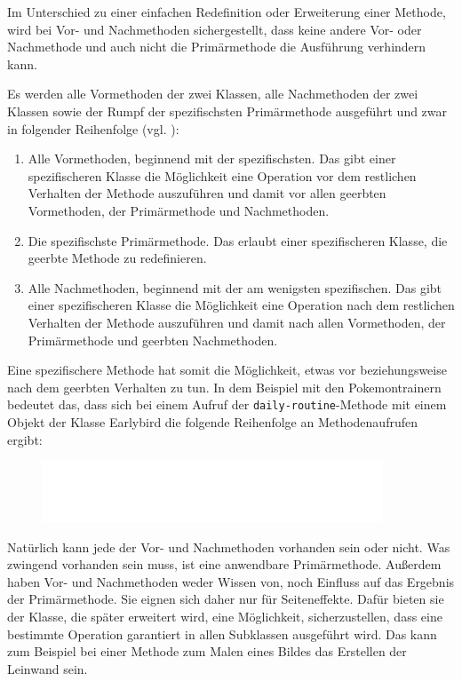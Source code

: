Im Unterschied zu einer einfachen Redefinition oder Erweiterung einer Methode, wird bei Vor- und Nachmethoden sichergestellt, dass keine andere Vor- oder Nachmethode und auch nicht die Primärmethode die Ausführung verhindern kann.

Es werden alle Vormethoden der zwei Klassen, alle Nachmethoden der zwei Klassen sowie der Rumpf der spezifischsten Primärmethode ausgeführt und zwar in folgender Reihenfolge (vgl. \cite[S. 50]{keene}):
\begin{enumerate}
 \item Alle Vormethoden, beginnend mit der spezifischsten. Das gibt einer spezifischeren Klasse die Möglichkeit eine Operation vor dem restlichen Verhalten der Methode auszuführen und damit vor allen geerbten Vormethoden, der Primärmethode und Nachmethoden.
 \item Die spezifischste Primärmethode. Das erlaubt einer spezifischeren Klasse, die geerbte Methode zu redefinieren.
 \item Alle Nachmethoden, beginnend mit der am wenigsten spezifischen. Das gibt einer spezifischeren Klasse die Möglichkeit eine Operation nach dem restlichen Verhalten der Methode auszuführen und damit nach allen Vormethoden, der Primärmethode und geerbten Nachmethoden.
\end{enumerate}

Eine spezifischere Methode hat somit die Möglichkeit, etwas vor beziehungsweise nach dem geerbten Verhalten zu tun. In dem Beispiel mit den Pokemontrainern bedeutet das, dass sich bei einem Aufruf der \texttt{daily-routine}-Methode mit einem Objekt der Klasse Earlybird die folgende Reihenfolge an Methodenaufrufen ergibt:

\begin{figure}[h]
 \centering
 \includegraphics[width=0.9\textwidth]{pictures/primary}
\end{figure}

Natürlich kann jede der Vor- und Nachmethoden vorhanden sein oder nicht. Was zwingend vorhanden sein muss, ist eine anwendbare Primärmethode. Außerdem haben Vor- und Nachmethoden weder Wissen von, noch Einfluss auf das Ergebnis der Primärmethode. Sie eignen sich daher nur für Seiteneffekte. Dafür bieten sie der Klasse, die später erweitert wird, eine Möglichkeit, sicherzustellen, dass eine bestimmte Operation garantiert in allen Subklassen ausgeführt wird. Das kann zum Beispiel bei einer Methode zum Malen eines Bildes das Erstellen der Leinwand sein.

